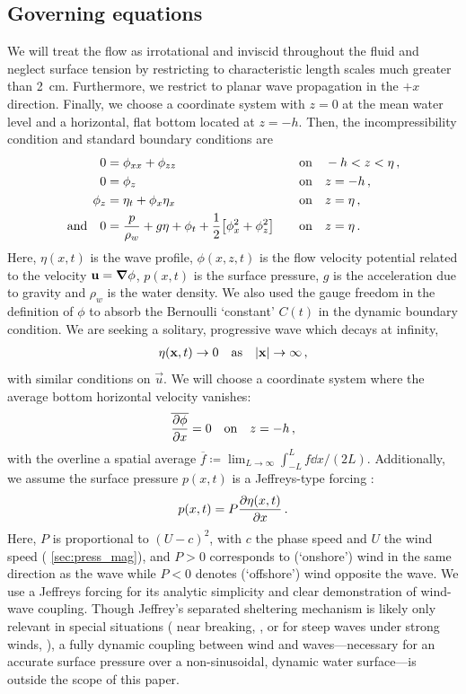 \documentclass{jfm}
\begin{document}
\subsection{Governing equations}
We will treat the flow as irrotational and inviscid throughout the
fluid and neglect surface tension by restricting to characteristic
length scales much greater than \SI{2}{\centi\meter}.
Furthermore, we restrict to planar wave propagation in the $+x$
direction.
Finally, we choose a coordinate system with $z=0$ at the mean water
level and a horizontal, flat bottom located at $z=-h$.
Then, the incompressibility condition and standard boundary conditions
are
\begin{alignat}{2}
  0 &= \phi_{xx} + \phi_{zz} &&\qq{on}
  -h < z < \eta \,, \label{eq:laplace}\\
  0 &= \phi_{z} &&\qq{on} z=-h \,, \label{eq:bottom_bc}\\
  \phi_{z} &= \eta_{t} + \phi_{x} \eta_{x} &&\qq{on} z = \eta \,,
  \label{eq:kinematic_bc}\\
  \qq*{and} 0 &= \frac{p}{\rho_w} + g\eta + \phi_{t} +
  \frac{1}{2} \bqty{\phi_{x}^2 + \phi_{z}^2} &&\qq{on} z=
  \eta \,. \label{eq:dynamic_bc}
\end{alignat}
Here, $\eta(x,t)$ is the wave profile, $\phi(x,z,t)$ is the flow
velocity potential related to the velocity $\mathbf{\bm{u}} = \grad{\phi}$,
$p(x,t)$ is the surface pressure, $g$ is the acceleration due to
gravity and $\rho_w$ is the water density.
We also used the gauge freedom in the definition of $\phi$ to absorb the
Bernoulli `constant' $C(t)$ in the dynamic boundary condition.
We are seeking a solitary, progressive wave which decays at infinity,
\begin{gather}
  \eta(\vec{x},t) \to 0 \qq{as} \abs{\vec{x}} \to \infty \,,
\end{gather}
with similar conditions on $\vec{u}$.
We will choose a coordinate system where the average bottom horizontal
velocity vanishes:
\begin{equation}
  \overline{ \pdv{\phi}{x} } = 0 \qq{on} z=-h \,,
  \label{eq:bot_bc_horz}
\end{equation}
with the overline a spatial average $\overline{f} \coloneqq
\lim_{L\to\infty} \int_{-L}^{L} f \dd{x} / (2L)$.
Additionally, we assume the surface pressure $p(x,t)$ is a Jeffreys-type
forcing \citep{jeffreys1925formation}:
\begin{equation}
  p(x,t) = P \pdv{\eta(x,t)}{x} \,.
\end{equation}
Here, $P$ is proportional to $(U-c)^2$, with $c$ the phase speed and $U$
the wind speed (\cf{} \cref{sec:press_mag}), and $P>0$ corresponds to
(`onshore') wind in the same direction as the wave while $P<0$ denotes
(`offshore') wind opposite the wave.
We use a Jeffreys forcing for its analytic simplicity and clear
demonstration of wind-wave coupling.
Though Jeffrey's separated sheltering mechanism is likely only relevant
in special situations (\eg{} near breaking,
\citealp{banner1976separation}, or for steep waves under strong winds,
\citealp{tian2013evolution,touboul2006interaction}),
a fully dynamic coupling between wind and waves---necessary for an
accurate surface pressure over a non-sinusoidal, dynamic water
surface---is outside the scope of this paper.
\end{document}
